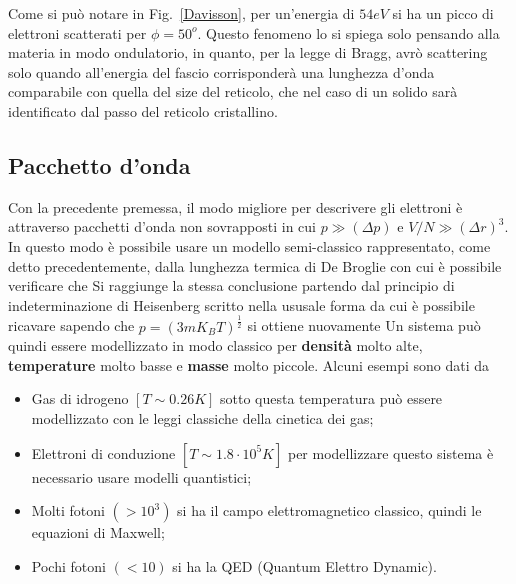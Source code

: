 Come si può notare in Fig.~\ref{Davisson}, per un'energia di $54eV$ si ha un picco di elettroni scatterati per $\phi=50^o$. Questo fenomeno lo si spiega solo pensando alla materia in modo ondulatorio, in quanto, per la legge di Bragg, avrò scattering solo quando all'energia del fascio corrisponderà una lunghezza d'onda comparabile con quella del size del reticolo, che nel caso di un solido sar\`a identificato dal passo del reticolo cristallino.
\subsection{Pacchetto d'onda}
Con la precedente premessa, il modo migliore per descrivere gli elettroni è attraverso  pacchetti d'onda non sovrapposti in cui $p\gg (\Delta p)$ e  $V/N \gg (\Delta r)^3$. In questo modo  è possibile usare un modello semi-classico rappresentato, come detto precedentemente, dalla lunghezza termica di De Broglie
con cui è possibile verificare che 
Si raggiunge la stessa conclusione partendo dal principio di indeterminazione di Heisenberg scritto nella ususale forma
da cui è possibile ricavare
sapendo che $p=(3mK_BT)^{\frac{1}{2}}$ si ottiene nuovamente
Un sistema può quindi essere modellizzato in modo classico per \textbf{densità} molto alte, \textbf{temperature} molto basse e \textbf{masse} molto piccole. Alcuni esempi sono dati da
\begin{itemize}
	\item Gas di idrogeno $[T\sim 0.26 K]$ sotto questa temperatura può essere modellizzato con le leggi classiche della cinetica dei gas;
	\item Elettroni di conduzione $[T \sim 1.8\cdot 10^5K]$ per modellizzare questo sistema è necessario usare modelli quantistici;
	\item Molti fotoni $(>10^3)$ si ha il campo elettromagnetico classico, quindi le equazioni di Maxwell;
	\item Pochi fotoni $(<10)$ si ha la QED (Quantum Elettro Dynamic).
\end{itemize}

